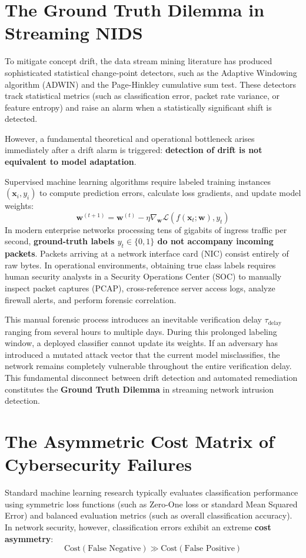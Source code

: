 \documentclass[12pt,a4paper,oneside]{report}
\begin{document}
\section{The Ground Truth Dilemma in Streaming NIDS}
To mitigate concept drift, the data stream mining literature has produced sophisticated statistical change-point detectors, such as the Adaptive Windowing algorithm (ADWIN) and the Page-Hinkley cumulative sum test. These detectors track statistical metrics (such as classification error, packet rate variance, or feature entropy) and raise an alarm when a statistically significant shift is detected.

However, a fundamental theoretical and operational bottleneck arises immediately after a drift alarm is triggered: \textbf{detection of drift is not equivalent to model adaptation}. 

Supervised machine learning algorithms require labeled training instances $(\mathbf{x}_i, y_i)$ to compute prediction errors, calculate loss gradients, and update model weights:
\begin{equation}
\mathbf{w}^{(t+1)} = \mathbf{w}^{(t)} - \eta \nabla_{\mathbf{w}} \mathcal{L}(f(\mathbf{x}_t; \mathbf{w}), y_t)
\end{equation}
In modern enterprise networks processing tens of gigabits of ingress traffic per second, \textbf{ground-truth labels $y_t \in \{0, 1\}$ do not accompany incoming packets}. Packets arriving at a network interface card (NIC) consist entirely of raw bytes. In operational environments, obtaining true class labels requires human security analysts in a Security Operations Center (SOC) to manually inspect packet captures (PCAP), cross-reference server access logs, analyze firewall alerts, and perform forensic correlation.

This manual forensic process introduces an inevitable verification delay $\tau_{\text{delay}}$ ranging from several hours to multiple days. During this prolonged labeling window, a deployed classifier cannot update its weights. If an adversary has introduced a mutated attack vector that the current model misclassifies, the network remains completely vulnerable throughout the entire verification delay. This fundamental disconnect between drift detection and automated remediation constitutes the \textbf{Ground Truth Dilemma} in streaming network intrusion detection.

\section{The Asymmetric Cost Matrix of Cybersecurity Failures}
Standard machine learning research typically evaluates classification performance using symmetric loss functions (such as Zero-One loss or standard Mean Squared Error) and balanced evaluation metrics (such as overall classification accuracy). In network security, however, classification errors exhibit an extreme \textbf{cost asymmetry}:
\begin{equation}
\text{Cost}(\text{False Negative}) \gg \text{Cost}(\text{False Positive})
\end{equation}
\end{document}
